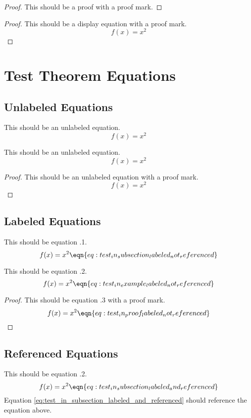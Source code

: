 \begin{proof}
    This should be a proof with a proof mark.
\end{proof}

\begin{proof}
    This should be a display equation with a proof mark.
    \[ f(x) = x^2 \]
\end{proof}


\section{Test Theorem Equations}

\subsection{Unlabeled Equations}

This should be an unlabeled equation.
\[ f(x) = x^2 \]

\begin{theorem}
    This should be an unlabeled equation.
    \[ f(x) = x^2 \]
\end{theorem}

\begin{proof}
    This should be an unlabeled equation with a proof mark.
    \[ f(x) = x^2 \]
\end{proof}

\subsection{Labeled Equations}

This should be equation \thesubsection.1.
\[ f(x) = x^2 \eqn{eq:test_in_subsection_labeled_not_referenced} \]

\begin{example}
    This should be equation \thesubsection.2.
    \[ f(x) = x^2 \eqn{eq:test_in_example_labeled_not_referenced} \]
\end{example}

\begin{proof}
    This should be equation \thesubsection.3 with a proof mark.
    \[ f(x) = x^2 \eqn{eq:test_in_proof_labeled_not_referenced} \]
\end{proof}

\subsection{Referenced Equations}

This should be equation \thesubsection.2.
\[ f(x) = x^2 \eqn{eq:test_in_subsection_labeled_and_referenced} \]
Equation \eqref{eq:test_in_subsection_labeled_and_referenced} should reference the equation above.

